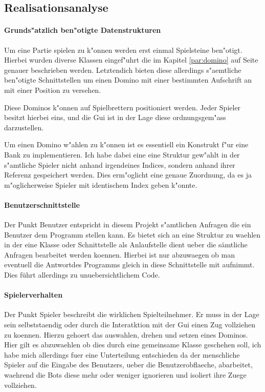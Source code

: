 \subsection{Realisationsanalyse}
\paragraph{Grunds"atzlich ben"otigte Datenstrukturen}
Um eine Partie spielen zu k"onnen werden erst einmal Spielsteine ben"otigt. Hierbei wurden diverse Klassen eingef"uhrt die im Kapitel  \ref{par:domino} auf Seite \pageref{par:domino}
genauer beschrieben werden. Letztendich bieten diese allerdings s"aemtliche ben"otigte Schnittstellen um einen Domino mit einer bestimmten Aufschrift an mit einer Position zu versehen. 

Diese Dominos k"onnen auf Spielbrettern positioniert werden. Jeder Spieler besitzt hierbei eins, und die Gui ist in der Lage diese ordnungsgem"ass darzustellen. 

Um einen Domino w"ahlen zu k"onnen ist es essentiell ein Konstrukt f"ur eine Bank zu implementieren. Ich habe dabei eine eine Struktur gew"ahlt in der s"amtliche Spieler nicht anhand irgendeines Indices, sondern anhand ihrer Referenz gespeichert werden. Dies erm"oglicht eine genaue Zuordnung, da es ja m"oglicherweise Spieler mit identischem Index geben k"onnte. 

\paragraph{Benutzerschnittstelle}
Der Punkt Benutzer entspricht in diesem Projekt s"amtlichen Anfragen die ein Benutzer dem Programm stellen kann. Es bietet sich an eine Struktur zu waehlen in der eine Klasse oder Schnittstelle als Anlaufstelle dient ueber die sämtliche Anfragen bearbeitet werden koennen. Hierbei ist nur abzuwaegen ob man eventuell die \glqq Antwort\grqq  des Programms gleich in diese Schnittstelle mit aufnimmt. Dies führt allerdings zu unuebersichtlichem Code. 

\paragraph{Spielerverhalten}
Der Punkt Spieler beschreibt die wirklichen Spielteilnehmer. Er muss in der Lage sein selbststaendig oder durch die Interatktion mit der Gui einen Zug vollziehen zu koennen. Hierzu gehoert das auswahlen, drehen und setzen eines Dominos. Hier gilt es abzuwaehlen ob dies durch eine gemeinsame Klasse geschehen soll, ich habe mich allerdings fuer eine Unterteilung entschieden da der menschliche Spieler auf die Eingabe des Benutzers, ueber die Benutzerobflaeche, abarbeitet, waehrend die Bots diese mehr oder weniger ignorieren und isoliert ihre Zuege vollziehen. 

